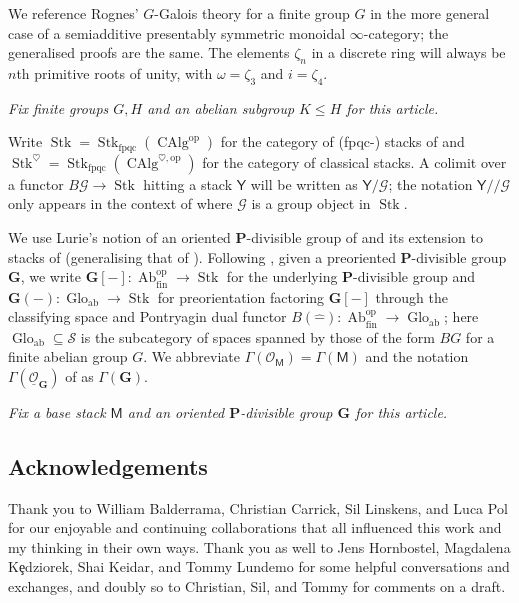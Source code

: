 \documentclass[11pt, a4paper]{article}
\newcommand{\ab}{\mathrm{ab}}
\newcommand{\fin}{\mathrm{fin}}
\newcommand{\fpqc}{\mathrm{fpqc}}
\newcommand{\1}{\mathbf{1}}
\DeclareMathOperator{\Ab}{Ab}
\DeclareMathOperator{\CAlg}{CAlg}
\DeclareMathOperator{\Glo}{Glo}
\DeclareMathOperator{\Stk}{Stk}
\newcommand{\Spc}{\mathcal{S}}
\newcommand{\op}{\mathrm{op}}
\newcommand{\ul}[1]{\underline{#1}}
\newcommand{\dual}[1]{{\widehat{#1}}}
\newcommand{\G}{\mathbf{G}}
\newcommand{\calG}{\mathcal{G}}
\newcommand{\M}{\mathsf{M}}
\renewcommand{\O}{\mathcal{O}}
\renewcommand{\P}{\mathbf{P}}
\newcommand{\Y}{\mathsf{Y}}
\newcommand{\Ga}{\Gamma}
\theoremstyle{plain}
\theoremstyle{definition}
\theoremstyle{remark}\numberwithin{equation}{section}
\begin{document}
We reference Rognes' $G$-Galois theory \cite{johnrognessdualisinggorups} for a finite group $G$ in the more general case of a semiadditive presentably symmetric monoidal $\infty$-category; the generalised proofs are the same. The elements $\zeta_n$ in a discrete ring will always be $n$th primitive roots of unity, with $\omega = \zeta_3$ and $i = \zeta_4$.

\begin{center}
    \emph{Fix finite groups $G,H$ and an abelian subgroup $K\leq H$ for this article.}
\end{center}

Write $\Stk=\Stk_\fpqc(\CAlg^\op)$ for the category of (fpqc-) stacks of \cite[Def.3.1.1.3]{reconstruction} and $\Stk^\heartsuit = \Stk_\fpqc(\CAlg^{\heartsuit,\op})$ for the category of classical stacks. A colimit over a functor $B\calG \to \Stk$ hitting a stack $\Y$ will be written as $\Y/ \calG$; the notation $\Y//\calG$ only appears in the context of  where $\calG$ is a group object in $\Stk$.

We use Lurie's notion of an oriented $\P$-divisible group of \cite{ec3} and its extension to stacks of \cite[]{temperedglobal} (generalising that of \cite{elltempcomp}). Following \cite[Not.4.1.6]{temperedglobal}, given a preoriented $\P$-divisible group $\G$, we write $\G[-] \colon \Ab_\fin^\op \to \Stk$ for the underlying $\P$-divisible group and $\G(-)\colon \Glo_\ab \to \Stk$ for preorientation factoring $\G[-]$ through the classifying space and Pontryagin dual functor $B(\dual{-}) \colon \Ab_\fin^\op \to \Glo_\ab$; here $\Glo_\ab \subseteq \Spc$ is the subcategory of spaces spanned by those of the form $BG$ for a finite abelian group $G$. We abbreviate $\Ga(\O_\M) = \Ga(\M)$ and the notation $\Ga(\ul{\O}_\G)$ of \cite[Thm.A]{temperedglobal} as $\Ga(\G)$. 

\begin{center}
    \emph{Fix a base stack $\M$ and an oriented $\P$-divisible group $\G$ for this article.}
\end{center}

\subsection*{Acknowledgements}
Thank you to William Balderrama, Christian Carrick, Sil Linskens, and Luca Pol for our enjoyable and continuing collaborations that all influenced this work and my thinking in their own ways. Thank you as well to Jens Hornbostel, Magdalena K\c{e}dziorek, Shai Keidar, and Tommy Lundemo for some helpful conversations and exchanges, and doubly so to Christian, Sil, and Tommy for comments on a draft.
\end{document}
